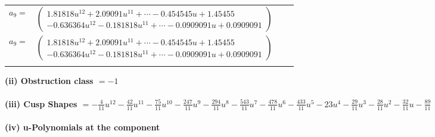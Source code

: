 \documentclass[1p]{elsarticle_modified}
\theoremstyle{definition}
\begin{document}
\begin{tabular}{m{7pt} m{180pt} m{7pt} m{180pt} }
\flushright $a_{9}=$&$\begin{pmatrix}1.81818 u^{12}+2.09091 u^{11}+\cdots-0.454545 u+1.45455\\-0.636364 u^{12}-0.181818 u^{11}+\cdots-0.0909091 u+0.0909091\end{pmatrix}$\\ \flushright $a_{9}=$&$\begin{pmatrix}1.81818 u^{12}+2.09091 u^{11}+\cdots-0.454545 u+1.45455\\-0.636364 u^{12}-0.181818 u^{11}+\cdots-0.0909091 u+0.0909091\end{pmatrix}$\\&\end{tabular}
\flushleft \textbf{(ii) Obstruction class $= -1$}\\~\\
\flushleft \textbf{(iii) Cusp Shapes $= -\frac{4}{11} u^{12}-\frac{42}{11} u^{11}-\frac{75}{11} u^{10}-\frac{247}{11} u^9-\frac{294}{11} u^8-\frac{543}{11} u^7-\frac{478}{11} u^6-\frac{433}{11} u^5-23 u^4-\frac{29}{11} u^3-\frac{28}{11} u^2-\frac{32}{11} u-\frac{89}{11}$}\\~\\
\newpage\renewcommand{\arraystretch}{1}
\flushleft \textbf{(iv) u-Polynomials at the component}\newline \\
\end{document}
